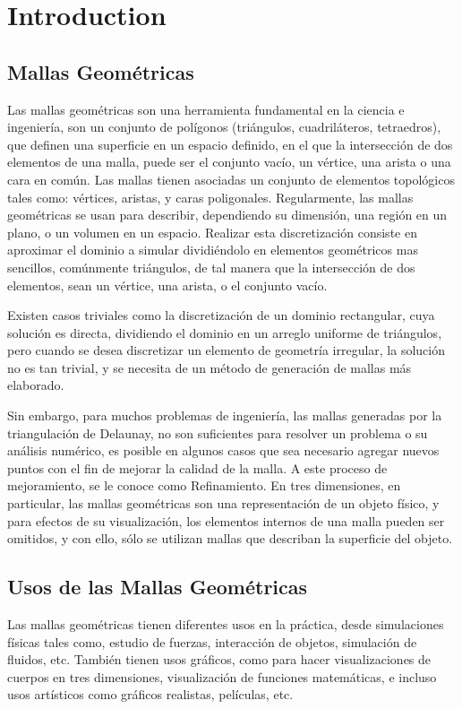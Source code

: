 \chapter{Introduction}
\label{ch:introduction}

\section{Mallas Geométricas}
\label{sec:mallasGeometricas}
Las mallas geométricas son una herramienta fundamental en la ciencia e ingeniería, son
un conjunto de polígonos (triángulos, cuadriláteros, tetraedros), que definen una superficie en un
espacio definido, en el que la intersección de dos elementos de una malla, puede ser el conjunto
vacío, un vértice, una arista o una cara en común. Las mallas tienen asociadas un conjunto de
elementos topológicos tales como: vértices, aristas, y caras poligonales.
Regularmente, las mallas geométricas se usan para describir, dependiendo su dimensión,
una región en un plano, o un volumen en un espacio. Realizar esta discretización consiste en
aproximar el dominio a simular dividiéndolo en elementos geométricos mas sencillos,
comúnmente triángulos, de tal manera que la intersección de dos elementos, sean un vértice, una
arista, o el conjunto vacío.

Existen casos triviales como la discretización de un dominio rectangular, cuya solución es
directa, dividiendo el dominio en un arreglo uniforme de triángulos, pero cuando se desea
discretizar un elemento de geometría irregular, la solución no es tan trivial, y se necesita de un
método de generación de mallas más elaborado.

Sin embargo, para muchos problemas de ingeniería, las mallas generadas por la
triangulación de Delaunay, no son suficientes para resolver un problema o su análisis numérico,
es posible en algunos casos que sea necesario agregar nuevos puntos con el fin de mejorar la
calidad de la malla. A este proceso de mejoramiento, se le conoce como Refinamiento.
En tres dimensiones, en particular, las mallas geométricas son una representación de un
objeto físico, y para efectos de su visualización, los elementos internos de una malla pueden ser
omitidos, y con ello, sólo se utilizan mallas que describan la superficie del objeto.

\section{Usos de las Mallas Geométricas}
\label{sec:usosDeLasMallasGeometricas}
Las mallas geométricas tienen diferentes usos en la práctica, desde simulaciones físicas
tales como, estudio de fuerzas, interacción de objetos, simulación de fluidos, etc. También tienen
usos gráficos, como para hacer visualizaciones de cuerpos en tres dimensiones, visualización de
funciones matemáticas, e incluso usos artísticos como gráficos realistas, películas, etc.


